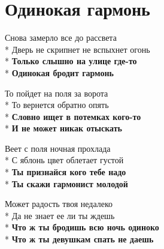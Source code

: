 \vspace{\fill}\newpage

\section{Одинокая гармонь}
\label{song:Одинокая_гармонь}

\medskip

\begin{minipage}{\linewidth}
Снова замерло все до рассвета\\*
Дверь не скрипнет не вспыхнет огонь\\*
\textbf{Только слышно на улице где-то}\\*
\textbf{Одинокая бродит гармонь}\\
\end{minipage}\par\medskip\nobreak

\medskip

\begin{minipage}{\linewidth}
То пойдет на поля за ворота\\*
То вернется обратно опять\\*
\textbf{Словно ищет в потемках кого-то}\\*
\textbf{И не может никак отыскать}\\
\end{minipage}\par\medskip\nobreak

\medskip

\begin{minipage}{\linewidth}
Веет с поля ночная прохлада\\*
С яблонь цвет облетает густой\\*
\textbf{Ты признайся кого тебе надо}\\*
\textbf{Ты скажи гармонист молодой}\\
\end{minipage}\par\medskip\nobreak

\medskip

\begin{minipage}{\linewidth}
Может радость твоя недалеко\\*
Да не знает ее ли ты ждешь\\*
\textbf{Что ж ты бродишь всю ночь одиноко}\\*
\textbf{Что ж ты девушкам спать не даешь}\\
\end{minipage}

